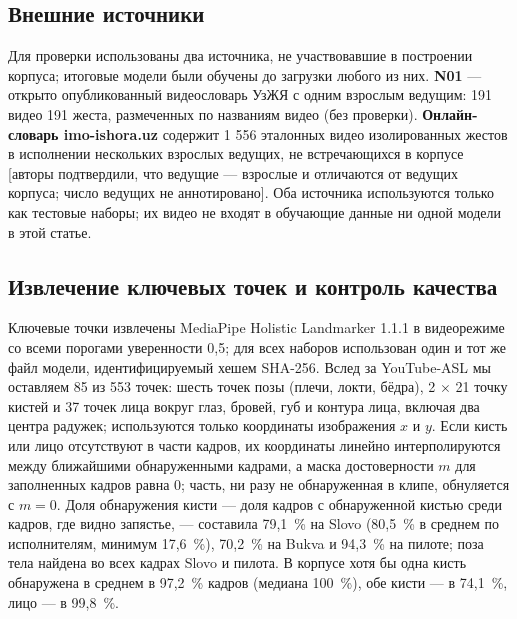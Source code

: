\documentclass[a4paper,fleqn]{cas-dc}
\begin{document}
\hypertarget{ux432ux43dux435ux448ux43dux438ux435-ux438ux441ux442ux43eux447ux43dux438ux43aux438}{%
\subsection{Внешние источники}\label{ux432ux43dux435ux448ux43dux438ux435-ux438ux441ux442ux43eux447ux43dux438ux43aux438}}

Для проверки использованы два источника, не участвовавшие в построении корпуса; итоговые модели были обучены до загрузки любого из них. \textbf{N01} --- открыто опубликованный видеословарь УзЖЯ с одним взрослым ведущим: 191 видео 191 жеста, размеченных по названиям видео (без проверки). \textbf{Онлайн-словарь imo-ishora.uz} содержит 1 556 эталонных видео изолированных жестов в исполнении нескольких взрослых ведущих, не встречающихся в корпусе {\color{red}[авторы подтвердили, что ведущие --- взрослые и отличаются от ведущих корпуса; число ведущих не аннотировано]}. Оба источника используются только как тестовые наборы; их видео не входят в обучающие данные ни одной модели в этой статье.

\hypertarget{ux438ux437ux432ux43bux435ux447ux435ux43dux438ux435-ux43aux43bux44eux447ux435ux432ux44bux445-ux442ux43eux447ux435ux43a-ux438-ux43aux43eux43dux442ux440ux43eux43bux44c-ux43aux430ux447ux435ux441ux442ux432ux430}{%
\subsection{Извлечение ключевых точек и контроль качества}\label{ux438ux437ux432ux43bux435ux447ux435ux43dux438ux435-ux43aux43bux44eux447ux435ux432ux44bux445-ux442ux43eux447ux435ux43a-ux438-ux43aux43eux43dux442ux440ux43eux43bux44c-ux43aux430ux447ux435ux441ux442ux432ux430}}

Ключевые точки извлечены MediaPipe Holistic Landmarker 1.1.1 \cite{docs_mediapipe_holistic_landmarker} в видеорежиме со всеми порогами уверенности 0,5; для всех наборов использован один и тот же файл модели, идентифицируемый хешем SHA-256. Вслед за YouTube-ASL \cite{2023_uthus_youtube_asl} мы оставляем 85 из 553 точек: шесть точек позы (плечи, локти, бёдра), 2 $\times$ 21 точку кистей и 37 точек лица вокруг глаз, бровей, губ и контура лица, включая два центра радужек; используются только координаты изображения \(x\) и \(y\). Если кисть или лицо отсутствуют в части кадров, их координаты линейно интерполируются между ближайшими обнаруженными кадрами, а маска достоверности \(m\) для заполненных кадров равна 0; часть, ни разу не обнаруженная в клипе, обнуляется с \(m = 0\). Доля обнаружения кисти --- доля кадров с обнаруженной кистью среди кадров, где видно запястье, --- составила 79,1~\% на Slovo (80,5~\% в среднем по исполнителям, минимум 17,6~\%), 70,2~\% на Bukva и 94,3~\% на пилоте; поза тела найдена во всех кадрах Slovo и пилота. В корпусе хотя бы одна кисть обнаружена в среднем в 97,2~\% кадров (медиана 100~\%), обе кисти --- в 74,1~\%, лицо --- в 99,8~\%.
\end{document}
